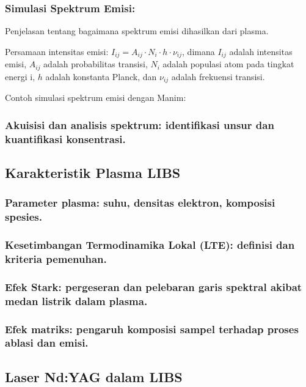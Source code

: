\subsubsection{Simulasi Spektrum Emisi:}

\par Penjelasan tentang bagaimana spektrum emisi dihasilkan dari plasma.
\par Persamaan intensitas emisi:  $I_{ij} = A_{ij} \cdot N_i \cdot h \cdot \nu_{ij}$,  dimana $I_{ij}$ adalah intensitas emisi, $A_{ij}$ adalah probabilitas transisi, $N_i$ adalah populasi atom pada tingkat energi i, $h$ adalah konstanta Planck, dan  $\nu_{ij}$ adalah frekuensi transisi.
\par Contoh simulasi spektrum emisi dengan Manim:


\subsubsection{Akuisisi dan analisis spektrum: identifikasi unsur dan kuantifikasi konsentrasi.}


\subsection{Karakteristik Plasma LIBS}

\subsubsection{Parameter plasma: suhu, densitas elektron, komposisi spesies.}
\subsubsection{Kesetimbangan Termodinamika Lokal (LTE): definisi dan kriteria pemenuhan.}
\subsubsection{Efek Stark: pergeseran dan pelebaran garis spektral akibat medan listrik dalam plasma.}
\subsubsection{Efek matriks: pengaruh komposisi sampel terhadap proses ablasi dan emisi.}


\subsection{Laser Nd:YAG dalam LIBS}


